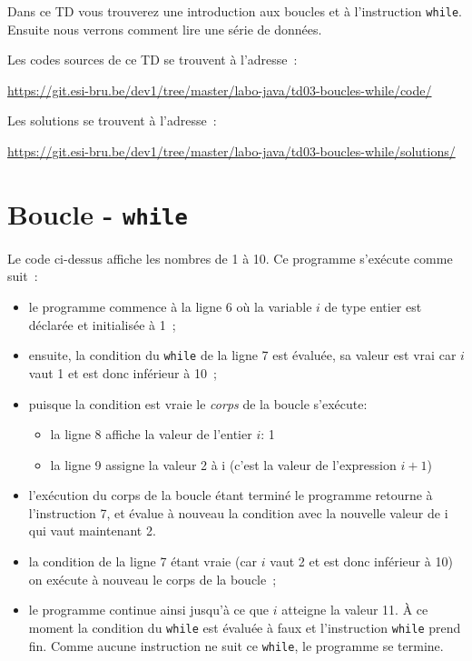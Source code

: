\documentclass[a4paper,11pt]{article}
\date{2018 -- 2019}
\newcommand{\publicbasepath}{https://git.esi-bru.be/dev1/tree/master/labo-java/td03-boucles-while}
\newcommand{\solutionspublicpath}{\publicbasepath/solutions/}
\renewcommand{\listingpublicpath}{\publicbasepath/code/}
\begin{document}
\entete
\titre
{}
\lastedit


	Dans ce TD vous trouverez une introduction aux boucles et à l'instruction \texttt{while}.
	Ensuite nous verrons comment lire une série de données.
	 
	 	Les codes sources de ce TD se trouvent à l'adresse~: 
	
	\url{\listingpublicpath}
	
	Les solutions se trouvent à l'adresse~:
	
		\url{\solutionspublicpath}


	\tableofcontents

	\newpage

\section{Boucle - \texttt{while}}

	Le code ci-dessus affiche les nombres de 1 à 10.
	Ce programme s'exécute comme suit~:
	\begin{itemize}
		\item  le programme commence à la ligne 6 où la variable $i$ de type entier est déclarée et initialisée à 1~;
		\item  ensuite, la condition du \texttt{while} de la ligne 7 est évaluée, sa valeur est vrai car $i$ vaut 1 et est donc inférieur à 10~;
		\item puisque la condition est vraie le \emph{corps} de la boucle s'exécute:
			\begin{itemize}
				\item la ligne 8 affiche la valeur de l'entier $i$: 1
				\item la ligne 9 assigne la valeur 2 à i (c'est la valeur de l'expression $i+1$)
			\end{itemize}
		\item l'exécution du corps de la boucle étant terminé le programme retourne à l'instruction 7, 
			et évalue à nouveau la condition avec la nouvelle valeur de i qui vaut maintenant 2.
		\item  la condition de la ligne 7 étant vraie (car $i$ vaut 2 et est donc inférieur à 10) on exécute à nouveau le corps de la boucle~;
		\item le programme continue ainsi jusqu'à ce que $i$ atteigne la valeur 11. 
			\`A ce moment la condition du \texttt{while} est évaluée à faux et l'instruction 
			\texttt{while} prend fin.
			Comme aucune instruction ne suit ce \texttt{while}, le programme se termine.
	\end{itemize}
\end{document}
